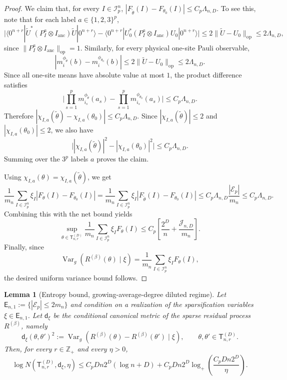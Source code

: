 \documentclass[12pt]{article}
\newtheorem{lemma}[theorem]{Lemma}
\newcommand{\mcE}{\mathcal{E}}
\newcommand{\mcI}{\mathcal{I}}
\newcommand{\mcJ}{\mathcal{J}}
\newcommand{\tvar}{\operatorname{Var}}
\begin{document}
\begin{proof}
We claim that, for every \(I\in\mcI_p^n\), $|F_{\tilde\theta}(I)-F_{\theta_0}(I)|
    \le
    C_p\Lambda_{n,D}$.
To see this, note that for each label \(a\in\{1,2,3\}^p\),
\[
\big|
\langle 0^{n+r}|
\widetilde U^*(P_I^a\otimes I_{\mathrm{anc}})\widetilde U
|0^{n+r}\rangle
-
\langle 0^{n+r}|
U_0^*(P_I^a\otimes I_{\mathrm{anc}})U_0
|0^{n+r}\rangle
\big|
\le
2\|\widetilde U-U_0\|_{\mathrm{op}}
\le
2\Lambda_{n,D},
\]
since \(\|P_I^a\otimes I_{\mathrm{anc}}\|_{\mathrm{op}}=1\). Similarly, for every physical
one-site Pauli observable,
\[
|m_i^{\phi_{\tilde \theta}}(b)-m_i^{\phi_{\theta_0}}(b)|
\le
2\|\widetilde U-U_0\|_{\mathrm{op}}
\le
2\Lambda_{n,D}.
\]
Since all one-site means have absolute value at most \(1\), the product
difference satisfies
\[
\big|
\prod_{s=1}^p m_{i_s}^{\phi_{\tilde \theta}}(a_s)
-
\prod_{s=1}^p m_{i_s}^{\phi_{\theta_0}}(a_s)
\big|
\le
C_p\Lambda_{n,D}.
\]
Therefore $|\chi_{I,a}(\widetilde\theta)-\chi_{I,a}(\theta_0)|
\le
C_p\Lambda_{n,D}$. Since \(|\chi_{I,a}(\widetilde\theta)|\le2\) and
\(|\chi_{I,a}(\theta_0)|\le2\), we also have
\[
\big|
|\chi_{I,a}(\widetilde\theta)|^2
-
|\chi_{I,a}(\theta_0)|^2
\big |
\le
C_p\Lambda_{n,D}.
\]
Summing over the \(3^p\) labels \(a\) proves the claim.

Using \(\chi_{I,a}(\theta)=\chi_{I,a}(\widetilde\theta)\), we get
\[
\frac1{m_n}
\sum_{I\in\mcI_p^n}
\xi_I
|F_{\theta}(I)-F_{\theta_0}(I)|
=
\frac1{m_n}
\sum_{I\in\mcI_p^n}
\xi_I
|F_{\tilde\theta}(I)-F_{\theta_0}(I)|  
\le
C_p\Lambda_{n,D}\frac{|\mcE_p|}{m_n}
\le
C_p\Lambda_{n,D}.
\]
Combining this with the net bound yields
\[
\sup_{\theta\in\mathsf{T}_{n,r}^{(D)}}
\frac1{m_n}
\sum_{I\in\mcI_p^n}\xi_I F_\theta(I)
\le
C_p
\left[
\frac{2^D}{n}
+
\frac{\mcJ_{n,D}}{m_n}
\right].
\]
Finally, since
\[
\tvar_g
(
R^{(\beta)}(\theta)\mid \xi
)
=
\frac1{m_n}
\sum_{I\in\mcI_p^n}
\xi_I
F_\theta(I),
\]
the desired uniform variance bound follows.
\end{proof}


\begin{lemma}[Entropy bound, growing-average-degree diluted regime]
\label{lem:sparse-residual-entropy}
Let $\mathsf E_{n,1} := \{|\mcE_p|\le 2m_n\}$ and condition on a realization of the sparsification variables \(\xi\in\mathsf E_{n,1}\).
Let \(\mathsf{d}_\xi\) be the conditional canonical metric of the sparse residual
process \(R^{(\beta)}\), namely
\[
\mathsf{d}_\xi(\theta,\theta')^2
:=
\tvar_g  (
R^{(\beta)}(\theta)-R^{(\beta)}(\theta')
\mid \xi
),
\qquad
\theta,\theta'\in\mathsf{T}_{n,r}^{(D)} .
\]
Then, for every \(r\in\mathbb Z_+\) and every \(\eta>0\),
\[
\log N(\mathsf{T}_{n,r}^{(D)},\mathsf{d}_\xi,\eta)
\le
C_pDn2^D(\log n+D)
+
C_pDn2^D
\log_+\left(
\frac{C_pDn2^D}{\eta}
\right).
\]
\end{lemma}
\end{document}
